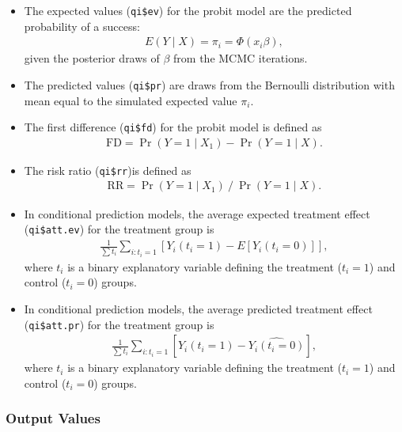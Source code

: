 \begin{itemize}
\item The expected values (\texttt{qi\$ev}) for the probit model are
the predicted probability of a success:
\begin{eqnarray*}
E(Y \mid X) = \pi_{i}= \Phi(x_i \beta),
\end{eqnarray*}
given the posterior draws of $\beta$ from the MCMC iterations.

\item The predicted values (\texttt{qi\$pr}) are draws from the Bernoulli
distribution with mean equal to the simulated expected value $\pi_{i}$.

\item The first difference (\texttt{qi\$fd}) for the probit model is defined
as
\begin{eqnarray*}
\text{FD}=\Pr(Y=1\mid X_{1})-\Pr(Y=1\mid X).
\end{eqnarray*}

\item The risk ratio (\texttt{qi\$rr})is defined as
\begin{eqnarray*}
\text{RR}=\Pr(Y=1\mid X_{1})\ /\ \Pr(Y=1\mid X).
\end{eqnarray*}

\item In conditional prediction models, the average expected treatment effect
(\texttt{qi\$att.ev}) for the treatment group is
\begin{eqnarray*}
\frac{1}{\sum t_{i}}\sum_{i:t_{i}=1}[Y_{i}(t_{i}=1)-E[Y_{i}(t_{i}=0)]],
\end{eqnarray*}
where $t_{i}$ is a binary explanatory variable defining the treatment
($t_{i}=1$) and control ($t_{i}=0$) groups. 

\item In conditional prediction models, the average predicted treatment effect
(\texttt{qi\$att.pr}) for the treatment group is
\begin{eqnarray*}
\frac{1}{\sum t_{i}}\sum_{i:t_{i}=1}[Y_{i}(t_{i}=1)-\widehat{Y_{i}(t_{i}=0)}],
\end{eqnarray*}
where $t_{i}$ is a binary explanatory variable defining the treatment
($t_{i}=1$) and control ($t_{i}=0$) groups. 
\end{itemize}

\subsubsection{Output Values}

